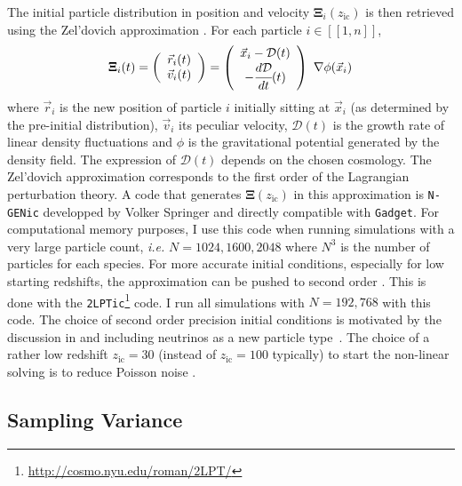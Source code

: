 The initial particle distribution in position and velocity $\pmb{\Xi}_i(z_{\mathrm{ic}})$ is then retrieved using the Zel'dovich approximation \citep{Zeldovich1970, Shandarin1989}. For each particle $i \in [\![ 1, n ]\!]$,
\begin{equation}
\pmb{\Xi}_i(t) = \left( 
\begin{array}{c}
\vec{r}_i (t) \\
\vec{v}_i (t)
\end{array}
\right) = \left( 
\begin{array}{c}
\vec{x}_i - \mathcal{D}(t) \\
- \cfrac{d \mathcal{D}}{dt} (t) 
\end{array}
\right) ~\nabla \phi (\vec{x}_i)
\end{equation} where $\vec{r}_i$ is the new position of particle $i$ initially sitting at $\vec{x}_i$ (as determined by the pre-initial distribution), $\vec{v}_i$ its peculiar velocity, $\mathcal{D}(t)$ is the growth rate of linear density fluctuations and $\phi$ is the gravitational potential generated by the density field. The expression of $\mathcal{D}(t)$ depends on the chosen cosmology. The Zel'dovich approximation corresponds to the first order of the Lagrangian perturbation theory. A code that generates $\pmb{\Xi}(z_{\mathrm{ic}})$ in this approximation is \texttt{N-GENic} developped by Volker Springer and directly compatible with \texttt{Gadget}. For computational memory purposes, I use this code when running simulations with a very large particle count, \textit{i.e.} $N=1024, 1600, 2048$ where $N^3$ is the number of particles for each species. For more accurate initial conditions, especially for low starting redshifts, the approximation can be pushed to second order \citep{Scoccimarro1998, Crocce2006, LHuillier2014}. This is done with the \texttt{2LPTic}\footnote{\url{http://cosmo.nyu.edu/roman/2LPT/}} code. I run all simulations with $N=192, 768$ with this code. The choice of second order precision initial conditions is motivated by the discussion in \citet{Crocce2006} and including neutrinos as a new particle type~\citep{Rossi2014}. The choice of a rather low redshift $z_{\mathrm{ic}}=30$ (instead of $z_{\mathrm{ic}}=100$ typically) to start the non-linear solving is to reduce Poisson noise \citep{Ali-Haimoud2012a, Bird2011a}. \\



\subsection{Sampling Variance}

